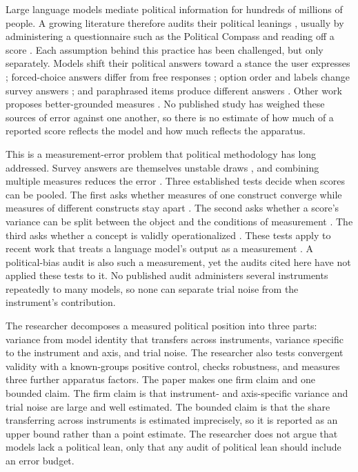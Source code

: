 \documentclass[12pt]{article}
\begin{document}
Large language models mediate
political information for hundreds of millions of people. A growing literature therefore audits their political
leanings \citep{santurkar2023, feng2023trails, buyl2026}, usually by administering a questionnaire such as the Political Compass
and reading off a score \citep{rozado2024, motoki2024, peng2026beyond}. Each assumption behind this practice
has been challenged, but only separately. Models shift their political answers toward a stance the user expresses
\citep{kaur2025echoes}; forced-choice answers differ from free responses \citep{rottger2024};
option order and labels change survey answers \citep{dominguezolmedo2024}; and paraphrased items produce different
answers \citep{ceron2024brittleness}. Other work proposes better-grounded measures \citep{faulborn2025littleleft,
wachter2025irt, rottger2026issuebench}. No published study has weighed these sources of error against one another, so there is no
estimate of how much of a reported score reflects the model and how much reflects the apparatus.

This is a measurement-error problem that political methodology has long addressed. Survey answers are themselves
unstable draws \citep{achen1975, zaller1992}, and combining multiple measures reduces the error
\citep{ansolabehere2008}. Three established tests decide when scores can be pooled. The first asks whether measures of
one construct converge while measures of different constructs stay apart \citep{campbell1959}. The second asks whether
a score's variance can be split between the object and the conditions of measurement \citep{cronbach1972, brennan2001}.
The third asks whether a concept is validly operationalized \citep{adcock2001}. These tests apply to
recent work that treats a language model's output as a measurement
\citep{lemens2025asking, bisbee2024}. A political-bias audit is also such a measurement, yet the audits cited here have
not applied these tests to it. No published audit administers several instruments repeatedly to many models, so none can separate
trial noise from the instrument's contribution.

The researcher decomposes a measured political position into three parts:
variance from model identity that transfers across instruments, variance specific to the instrument and axis, and trial
noise. The researcher also tests convergent validity with a known-groups positive control, checks robustness, and
measures three further apparatus factors. The paper makes one firm claim and one bounded claim. The firm claim is that
instrument- and axis-specific variance and trial noise are large and well estimated. The bounded claim is that the share
transferring across instruments is estimated imprecisely, so it is reported as an upper bound rather than a point
estimate. The researcher does not argue that models lack a political lean, only that any audit of political lean should
include an error budget.
\end{document}
